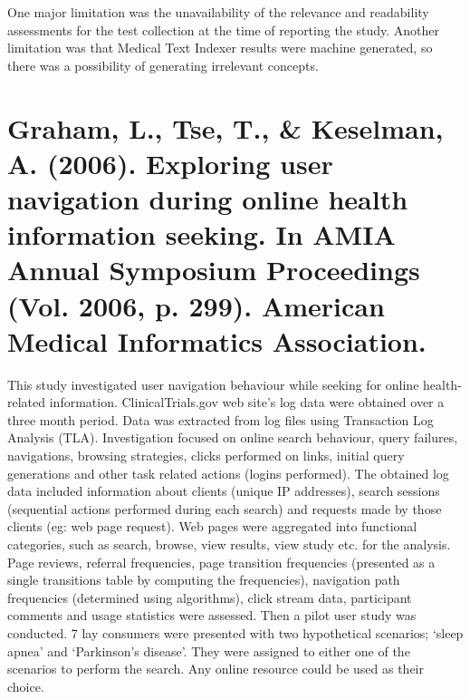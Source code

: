 \documentclass[]{article}
\begin{document}
One major limitation was the unavailability of the relevance and readability assessments for the test collection at the time of reporting the study. Another limitation was that Medical Text Indexer results were machine generated, so there was a possibility of generating irrelevant concepts.     

\section{Graham, L., Tse, T., \& Keselman, A. (2006). Exploring user navigation during online health information seeking. In AMIA Annual Symposium Proceedings (Vol. 2006, p. 299). American Medical Informatics Association.}

This study investigated user navigation behaviour while seeking for online health-related information. ClinicalTrials.gov web site's log data were obtained over a three month period. Data was extracted from log files using Transaction Log Analysis (TLA). Investigation focused on online search behaviour, query failures, navigations, browsing strategies, clicks performed on links, initial query generations and other task related actions (logins performed). The obtained log data included information about clients (unique IP addresses), search sessions (sequential actions performed during each search) and requests made by those clients (eg: web page request). Web pages were aggregated into functional categories, such as search, browse, view results, view study etc. for the analysis. Page reviews, referral frequencies, page transition frequencies (presented as a single transitions table by computing the frequencies), navigation path frequencies (determined using algorithms), click stream data, participant comments and usage statistics were assessed. Then a pilot user study was conducted. 7 lay consumers were presented with two hypothetical scenarios; ‘sleep apnea’ and ‘Parkinson’s disease’. They were assigned to either one of the scenarios to perform the search. Any online resource could be used as their choice. 
\end{document}
